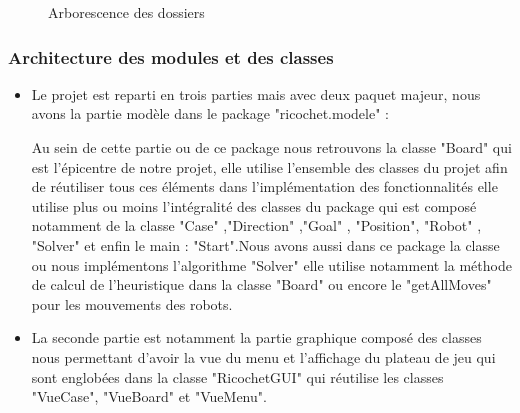 \documentclass[a4paper]{article} %
\begin{document}





\begin{figure}[h]
\begin{center}
\end{center}
\caption{Arborescence des dossiers}
\end{figure}
\subsubsection{Architecture des modules et des classes}
\begin{itemize}
\item Le projet est reparti en trois  parties mais avec deux paquet majeur, nous avons la partie modèle dans le package "ricochet.modele" : 

Au sein de cette partie ou de ce package nous retrouvons la classe "Board" qui est l'épicentre de notre projet, elle utilise l'ensemble des classes du projet afin de réutiliser tous ces éléments dans l’implémentation des fonctionnalités elle utilise plus ou moins l'intégralité des classes du package qui est composé notamment de la classe "Case" ,"Direction" ,"Goal" , "Position", "Robot" , "Solver" et enfin le main : "Start".Nous avons aussi dans ce package la classe  ou nous implémentons l'algorithme "Solver" elle utilise notamment la méthode de calcul de l'heuristique dans la classe "Board" ou encore le "getAllMoves" pour les mouvements des robots.

\item La seconde partie est notamment la partie graphique composé des classes nous permettant d'avoir la vue du menu et l'affichage du plateau de jeu qui sont englobées dans la classe "RicochetGUI" qui réutilise les classes "VueCase", "VueBoard" et "VueMenu".
\end{itemize}
\end{document}
